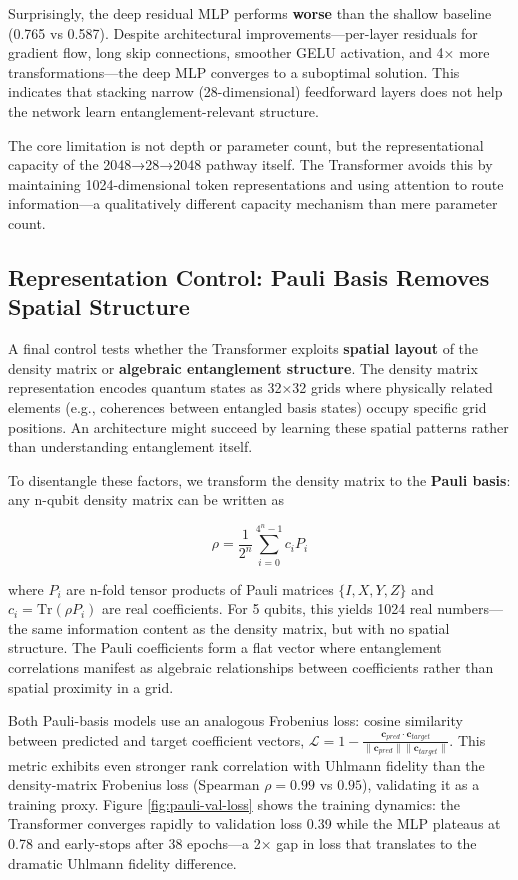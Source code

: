 \documentclass[11pt]{article}
\begin{document}
Surprisingly, the deep residual MLP performs \textbf{worse} than the shallow baseline (0.765 vs 0.587). Despite architectural improvements—per-layer residuals for gradient flow, long skip connections, smoother GELU activation, and 4× more transformations—the deep MLP converges to a suboptimal solution. This indicates that stacking narrow (28-dimensional) feedforward layers does not help the network learn entanglement-relevant structure.

The core limitation is not depth or parameter count, but the representational capacity of the 2048→28→2048 pathway itself. The Transformer avoids this by maintaining 1024-dimensional token representations and using attention to route information—a qualitatively different capacity mechanism than mere parameter count.
\subsection{Representation Control: Pauli Basis Removes Spatial Structure}
\label{sec:org4370bb4}

A final control tests whether the Transformer exploits \textbf{spatial layout} of the density matrix or \textbf{algebraic entanglement structure}. The density matrix representation encodes quantum states as 32×32 grids where physically related elements (e.g., coherences between entangled basis states) occupy specific grid positions. An architecture might succeed by learning these spatial patterns rather than understanding entanglement itself.

To disentangle these factors, we transform the density matrix to the \textbf{Pauli basis}: any n-qubit density matrix can be written as

$$\rho = \frac{1}{2^n} \sum_{i=0}^{4^n-1} c_i P_i$$

where \(P_i\) are n-fold tensor products of Pauli matrices \(\{I, X, Y, Z\}\) and \(c_i = \text{Tr}(\rho P_i)\) are real coefficients. For 5 qubits, this yields 1024 real numbers—the same information content as the density matrix, but with no spatial structure. The Pauli coefficients form a flat vector where entanglement correlations manifest as algebraic relationships between coefficients rather than spatial proximity in a grid.

Both Pauli-basis models use an analogous Frobenius loss: cosine similarity between predicted and target coefficient vectors, \(\mathcal{L} = 1 - \frac{\mathbf{c}_{pred} \cdot \mathbf{c}_{target}}{\|\mathbf{c}_{pred}\| \|\mathbf{c}_{target}\|}\). This metric exhibits even stronger rank correlation with Uhlmann fidelity than the density-matrix Frobenius loss (Spearman \(\rho = 0.99\) vs \(0.95\)), validating it as a training proxy. Figure \ref{fig:pauli-val-loss} shows the training dynamics: the Transformer converges rapidly to validation loss 0.39 while the MLP plateaus at 0.78 and early-stops after 38 epochs—a 2× gap in loss that translates to the dramatic Uhlmann fidelity difference.
\end{document}
